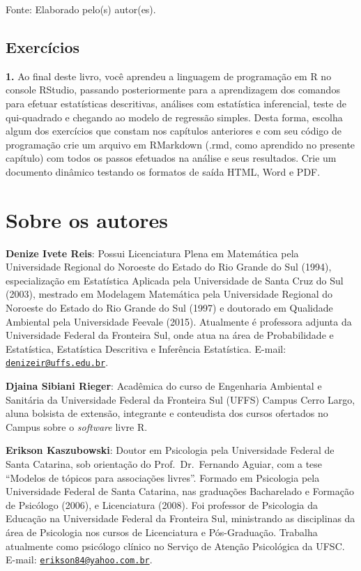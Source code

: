 \documentclass[12pt,brazil,oneside]{book}
\begin{document}
Fonte: Elaborado pelo(s) autor(es).

\hypertarget{exercicios-5}{%
\section{Exercícios}\label{exercicios-5}}

\textbf{1.} Ao final deste livro, você aprendeu a linguagem de programação em R no console RStudio, passando posteriormente para a aprendizagem dos comandos para efetuar estatísticas descritivas, análises com estatística inferencial, teste de qui-quadrado e chegando ao modelo de regressão simples. Desta forma, escolha algum dos exercícios que constam nos capítulos anteriores e com seu código de programação crie um arquivo em RMarkdown (.rmd, como aprendido no presente capítulo) com todos os passos efetuados na análise e seus resultados. Crie um documento dinâmico testando os formatos de saída HTML, Word e PDF.

\hypertarget{sobre-os-autores}{%
\chapter*{Sobre os autores}\label{sobre-os-autores}}

\textbf{Denize Ivete Reis}: Possui Licenciatura Plena em Matemática pela Universidade Regional do Noroeste do Estado do Rio Grande do Sul (1994), especialização em Estatística Aplicada pela Universidade de Santa Cruz do Sul (2003), mestrado em Modelagem Matemática pela Universidade Regional do Noroeste do Estado do Rio Grande do Sul (1997) e doutorado em Qualidade Ambiental pela Universidade Feevale (2015). Atualmente é professora adjunta da Universidade Federal da Fronteira Sul, onde atua na área de Probabilidade e Estatística, Estatística Descritiva e Inferência Estatística. E-mail: \href{mailto:denizeir@uffs.edu.br}{\nolinkurl{denizeir@uffs.edu.br}}.

\textbf{Djaina Sibiani Rieger}: Acadêmica do curso de Engenharia Ambiental e Sanitária da Universidade Federal da Fronteira Sul (UFFS) Campus Cerro Largo, aluna bolsista de extensão, integrante e conteudista dos cursos ofertados no Campus sobre o \emph{software} livre R.

\textbf{Erikson Kaszubowski}: Doutor em Psicologia pela Universidade Federal de Santa Catarina, sob orientação do Prof.~Dr.~Fernando Aguiar, com a tese ``Modelos de tópicos para associações livres''. Formado em Psicologia pela Universidade Federal de Santa Catarina, nas graduações Bacharelado e Formação de Psicólogo (2006), e Licenciatura (2008). Foi professor de Psicologia da Educação na Universidade Federal da Fronteira Sul, ministrando as disciplinas da área de Psicologia nos cursos de Licenciatura e Pós-Graduação. Trabalha atualmente como psicólogo clínico no Serviço de Atenção Psicológica da UFSC. E-mail: \href{mailto:erikson84@yahoo.com.br}{\nolinkurl{erikson84@yahoo.com.br}}.
\end{document}
